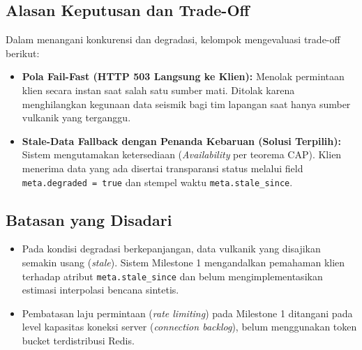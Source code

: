 \subsection{Alasan Keputusan dan Trade-Off}
Dalam menangani konkurensi dan degradasi, kelompok mengevaluasi trade-off berikut:
\begin{itemize}
    \item \textbf{Pola Fail-Fast (HTTP 503 Langsung ke Klien):} Menolak permintaan klien secara instan saat salah satu sumber mati. Ditolak karena menghilangkan kegunaan data seismik bagi tim lapangan saat hanya sumber vulkanik yang terganggu.
    \item \textbf{Stale-Data Fallback dengan Penanda Kebaruan (Solusi Terpilih):} Sistem mengutamakan ketersediaan (\textit{Availability} per teorema CAP). Klien menerima data yang ada disertai transparansi status melalui field \texttt{meta.degraded = true} dan stempel waktu \texttt{meta.stale\_since}.
\end{itemize}

\clearpage
\subsection{Batasan yang Disadari}
\begin{itemize}
    \item Pada kondisi degradasi berkepanjangan, data vulkanik yang disajikan semakin usang (\textit{stale}). Sistem Milestone 1 mengandalkan pemahaman klien terhadap atribut \texttt{meta.stale\_since} dan belum mengimplementasikan estimasi interpolasi bencana sintetis.
    \item Pembatasan laju permintaan (\textit{rate limiting}) pada Milestone 1 ditangani pada level kapasitas koneksi server (\textit{connection backlog}), belum menggunakan token bucket terdistribusi Redis.
\end{itemize}

